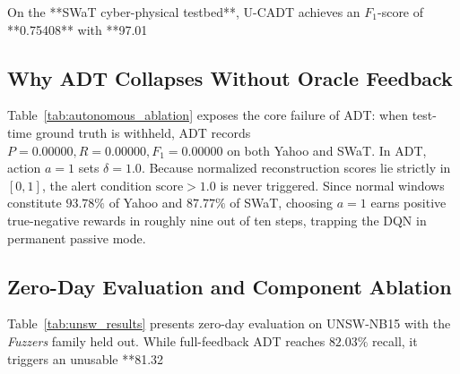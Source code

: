 \documentclass[conference]{IEEEtran}
\begin{document}
On the **SWaT cyber-physical testbed**, U-CADT achieves an $F_1$-score of **0.75408** with **97.01%

\subsection{Why ADT Collapses Without Oracle Feedback}
Table~\ref{tab:autonomous_ablation} exposes the core failure of ADT: when test-time ground truth is withheld, ADT records $P=0.00000, R=0.00000, F_1=0.00000$ on both Yahoo and SWaT. In ADT, action $a=1$ sets $\delta = 1.0$. Because normalized reconstruction scores lie strictly in $[0, 1]$, the alert condition $\text{score} > 1.0$ is never triggered. Since normal windows constitute $93.78\%$ of Yahoo and $87.77\%$ of SWaT, choosing $a=1$ earns positive true-negative rewards in roughly nine out of ten steps, trapping the DQN in permanent passive mode.

\subsection{Zero-Day Evaluation and Component Ablation}
Table~\ref{tab:unsw_results} presents zero-day evaluation on UNSW-NB15 with the \textit{Fuzzers} family held out. While full-feedback ADT reaches $82.03\%$ recall, it triggers an unusable **81.32%

\begin{table}[t]
\centering
\caption{UNSW-NB15 Zero-Day Holdout Comparison (Fuzzers Excluded)}
\label{tab:unsw_results}
\end{table}
\end{document}
